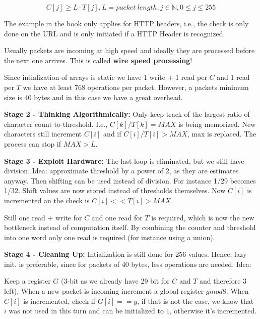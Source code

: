 $$C[j] \geq L \cdot T[j] , L = packet \ length, j \in \mathbb{N}, 0 \leq j \leq 255$$

The example in the book only applies for HTTP headers, i.e., the check is only done on the URL and is only initiated if a HTTP Header is recognized.

Usually packets are incoming at high speed and ideally they are processed before the next one arrives. This is called \textbf{wire speed processing}!

Since intialization of arrays is static we have 1 write + 1 read per $C$ and 1 read per $T$ we have at least 768 operations per packet. However, a packets minimum size is 40 bytes and in this case we have a great overhead.

\textbf{Stage 2 - Thinking Algorithmically:} Only keep track of the largest ratio of character count to threshold. I.e., $C[k]/T[k] = MAX$ is being memorized. New characters still increment $C[i]$ and if $C[i]/T[i] > MAX$, max is replaced. The process can stop if $MAX > L$.

\textbf{Stage 3 - Exploit Hardware:} The last loop is eliminated, but we still have division. Idea: approximate threshold by a power of 2, as they are estimates anyway. Then shifting can be used instead of division.
For instance 1/29 becomes 1/32. Shift values are now stored instead of thresholds themselves. Now $C[i]$ is incremented an the check is $C[i] << T[i] > MAX$.

Still one read + write for $C$ and one read for $T$ is required, which is now the new bottleneck instead of computation itself. By combining the counter and threshold into one word only one read is required (for instance using a union).


\textbf{Stage 4 - Cleaning Up:} Intialization is still done for 256 values. Hence, lazy init. is preferable, since for packets of 40 bytes, less operations are needed. Idea:

Keep a register $G$ (3-bit as we already have 29 bit for $C$ and $T$ and therefore 3 left). When a new packet is incoming increment a global register $g mod 8$. When $C[i]$ is incremented, check if $G[i] == g$, if that is not the case, we know that $i$ was not used in this turn and can be initialized to $1$, otherwise it's incremented.



























